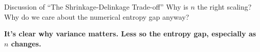 \documentclass[8pt]{beamer}\usepackage[]{graphicx}\usepackage[]{color}
\begin{document}
\begin{frame}{Discussion of ``The Shrinkage-Delinkage Trade-off''}
\pause
Why is $n$ the right scaling?  Why do we care about the numerical entropy gap anyway?

\textbf{It's clear why variance matters.  Less so the entropy gap,
especially as $n$ changes.}




\end{frame}




    
%     
%     
    
\end{document}
